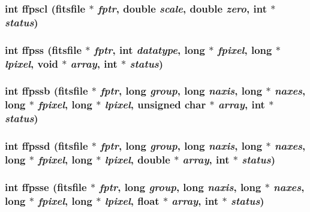 \subsubsection{\setlength{\rightskip}{0pt plus 5cm}int ffpscl (\bf{fitsfile} $\ast$ {\em fptr}, double {\em scale}, double {\em zero}, int $\ast$ {\em status})}\label{src_2fitsio_8h_55e6ba51c52d4c9ea77e745d5029a42c}


\subsubsection{\setlength{\rightskip}{0pt plus 5cm}int ffpss (\bf{fitsfile} $\ast$ {\em fptr}, int {\em datatype}, long $\ast$ {\em fpixel}, long $\ast$ {\em lpixel}, void $\ast$ {\em array}, int $\ast$ {\em status})}\label{src_2fitsio_8h_42bee00082b5cb488fa8a440392392b1}


\subsubsection{\setlength{\rightskip}{0pt plus 5cm}int ffpssb (\bf{fitsfile} $\ast$ {\em fptr}, long {\em group}, long {\em naxis}, long $\ast$ {\em naxes}, long $\ast$ {\em fpixel}, long $\ast$ {\em lpixel}, unsigned char $\ast$ {\em array}, int $\ast$ {\em status})}\label{src_2fitsio_8h_3c03b253046fc85ef6be13e34ac3d8b2}


\subsubsection{\setlength{\rightskip}{0pt plus 5cm}int ffpssd (\bf{fitsfile} $\ast$ {\em fptr}, long {\em group}, long {\em naxis}, long $\ast$ {\em naxes}, long $\ast$ {\em fpixel}, long $\ast$ {\em lpixel}, double $\ast$ {\em array}, int $\ast$ {\em status})}\label{src_2fitsio_8h_005342a1cc091d589dbc8dbfdc577e32}


\subsubsection{\setlength{\rightskip}{0pt plus 5cm}int ffpsse (\bf{fitsfile} $\ast$ {\em fptr}, long {\em group}, long {\em naxis}, long $\ast$ {\em naxes}, long $\ast$ {\em fpixel}, long $\ast$ {\em lpixel}, float $\ast$ {\em array}, int $\ast$ {\em status})}\label{src_2fitsio_8h_622b3a307ccbbbba93b0cf910a9c4091}


